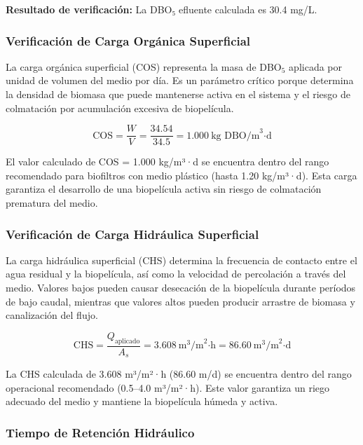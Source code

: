 \documentclass[12pt,a4paper]{article}
\begin{document}
\textbf{Resultado de verificación:} La DBO₅ efluente calculada es 30.4 mg/L.

\subsubsection*{Verificación de Carga Orgánica Superficial}

La carga orgánica superficial (COS) representa la masa de DBO$_5$ aplicada por unidad de volumen del medio por día. Es un parámetro crítico porque determina la densidad de biomasa que puede mantenerse activa en el sistema y el riesgo de colmatación por acumulación excesiva de biopelícula.

\begin{equation}
\text{COS} = \frac{W}{V} = \frac{34.54}{34.5} = 1.000\ \text{kg DBO/m}^3\text{·d}
\end{equation}

El valor calculado de COS = 1.000 kg/m³·d se encuentra dentro del rango recomendado para biofiltros con medio plástico (hasta 1.20 kg/m³·d). Esta carga garantiza el desarrollo de una biopelícula activa sin riesgo de colmatación prematura del medio.

\subsubsection*{Verificación de Carga Hidráulica Superficial}

La carga hidráulica superficial (CHS) determina la frecuencia de contacto entre el agua residual y la biopelícula, así como la velocidad de percolación a través del medio. Valores bajos pueden causar desecación de la biopelícula durante períodos de bajo caudal, mientras que valores altos pueden producir arrastre de biomasa y canalización del flujo.

\begin{equation}
\text{CHS} = \frac{Q_{\text{aplicado}}}{A_s} = 3.608\ \text{m}^3\text{/m}^2\text{·h} = 86.60\ \text{m}^3\text{/m}^2\text{·d}
\end{equation}

La CHS calculada de 3.608 m³/m²·h (86.60 m/d) se encuentra dentro del rango operacional recomendado (0.5--4.0 m³/m²·h). Este valor garantiza un riego adecuado del medio y mantiene la biopelícula húmeda y activa.

\subsubsection*{Tiempo de Retención Hidráulico}
\end{document}
